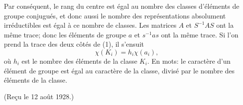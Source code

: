 Par conséquent, le rang du centre est égal au nombre des classes d'éléments de groupe conjugués, et donc aussi le nombre des représentations absolument irréductibles est égal à ce nombre de classes. Les matrices $A$ et $S^{-1}AS$ ont la même trace; donc les éléments de groupe $a$ et $s^{-1}as$ ont la même trace. Si l'on prend la trace des deux côtés de (1), il s'ensuit
\[
        \chi(K_i)=h_i\chi(a_i),
\]
où $h_i$ est le nombre des éléments de la classe $K_i$. En mots: le caractère d'un élément de groupe est égal au caractère de la classe, divisé par le nombre des éléments de la classe.

\begin{center}
(Reçu le 12 août 1928.)
\end{center}

\clearpage
